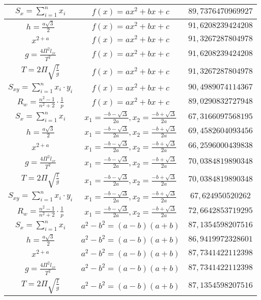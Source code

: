 \documentclass{article}
\begin{document}
\begin{flushleft}
\begin{longtable}{|c|c|c|}
$S_x=\sum_{i=1}^{n}x_i$ & $f(x)=ax^2+bx+c$ & $89,7376470969927$ \\ \hline 
$h=\frac{a\sqrt{3}}{2}$ & $f(x)=ax^2+bx+c$ & $91,6208239424208$ \\ \hline 
$x^{2+a}$ & $f(x)=ax^2+bx+c$ & $91,3267287804978$ \\ \hline 
$g=\frac{4\Pi ^2l_{zr}}{T^2}$ & $f(x)=ax^2+bx+c$ & $91,6208239424208$ \\ \hline 
$T=2\Pi \sqrt{\frac{l}{g}}$ & $f(x)=ax^2+bx+c$ & $91,3267287804978$ \\ \hline 
$S_{xy}=\sum_{i=1}^{n}x_i\cdot y_i$ & $f(x)=ax^2+bx+c$ & $90,4989074114367$ \\ \hline 
$R_w=\frac{n^2-1}{n^2+2}\cdot \frac{1}{p}$ & $f(x)=ax^2+bx+c$ & $89,0290832727948$ \\ \hline 
$S_x=\sum_{i=1}^{n}x_i$ & $x_1=\frac{-b-\sqrt{\Delta }}{2a},x_2=\frac{-b+\sqrt{\Delta }}{2a}$ & $67,3166097568195$ \\ \hline 
$h=\frac{a\sqrt{3}}{2}$ & $x_1=\frac{-b-\sqrt{\Delta }}{2a},x_2=\frac{-b+\sqrt{\Delta }}{2a}$ & $69,4582604093456$ \\ \hline 
$x^{2+a}$ & $x_1=\frac{-b-\sqrt{\Delta }}{2a},x_2=\frac{-b+\sqrt{\Delta }}{2a}$ & $66,2596000439838$ \\ \hline 
$g=\frac{4\Pi ^2l_{zr}}{T^2}$ & $x_1=\frac{-b-\sqrt{\Delta }}{2a},x_2=\frac{-b+\sqrt{\Delta }}{2a}$ & $70,0384819890348$ \\ \hline 
$T=2\Pi \sqrt{\frac{l}{g}}$ & $x_1=\frac{-b-\sqrt{\Delta }}{2a},x_2=\frac{-b+\sqrt{\Delta }}{2a}$ & $70,0384819890348$ \\ \hline 
$S_{xy}=\sum_{i=1}^{n}x_i\cdot y_i$ & $x_1=\frac{-b-\sqrt{\Delta }}{2a},x_2=\frac{-b+\sqrt{\Delta }}{2a}$ & $67,624950520262$ \\ \hline 
$R_w=\frac{n^2-1}{n^2+2}\cdot \frac{1}{p}$ & $x_1=\frac{-b-\sqrt{\Delta }}{2a},x_2=\frac{-b+\sqrt{\Delta }}{2a}$ & $72,6642853719295$ \\ \hline 
$S_x=\sum_{i=1}^{n}x_i$ & $a^2-b^2=(a-b)(a+b)$ & $87,1354598207516$ \\ \hline 
$h=\frac{a\sqrt{3}}{2}$ & $a^2-b^2=(a-b)(a+b)$ & $86,9419972328601$ \\ \hline 
$x^{2+a}$ & $a^2-b^2=(a-b)(a+b)$ & $87,7341422112398$ \\ \hline 
$g=\frac{4\Pi ^2l_{zr}}{T^2}$ & $a^2-b^2=(a-b)(a+b)$ & $87,7341422112398$ \\ \hline 
$T=2\Pi \sqrt{\frac{l}{g}}$ & $a^2-b^2=(a-b)(a+b)$ & $87,1354598207516$ \\ \hline 

\end{longtable}
\end{flushleft}
\end{document}
